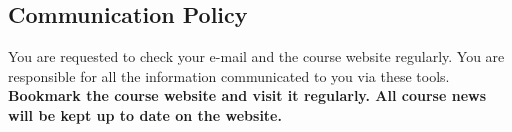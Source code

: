 \documentclass[10pt,a4paper,american]{exam}
\begin{document}
\subsection{Communication Policy}
You are requested to check your e-mail and the course website regularly. You are responsible for all the information communicated to you via these tools. \textbf{Bookmark the course website and visit it regularly. All course news will be kept up to date on the website.}
\end{document}
